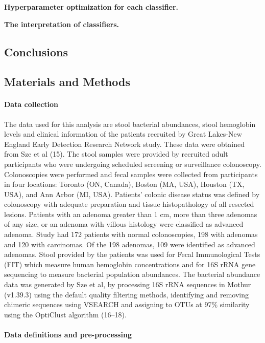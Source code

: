 \documentclass[11pt,]{article}
\let\oldparagraph\paragraph
\renewcommand{\paragraph}[1]{\oldparagraph{#1}\mbox{}}
\begin{document}
\textbf{Hyperparameter optimization for each classifier.}

\textbf{The interpretation of classifiers.}

\subsection{Conclusions}\label{conclusions}

\subsection{Materials and Methods}\label{materials-and-methods}

\paragraph{Data collection}\label{data-collection}

The data used for this analysis are stool bacterial abundances, stool
hemoglobin levels and clinical information of the patients recruited by
Great Lakes-New England Early Detection Research Network study. These
data were obtained from Sze et al (15). The stool samples were provided
by recruited adult participants who were undergoing scheduled screening
or surveillance colonoscopy. Colonoscopies were performed and fecal
samples were collected from participants in four locations: Toronto (ON,
Canada), Boston (MA, USA), Houston (TX, USA), and Ann Arbor (MI, USA).
Patients' colonic disease status was defined by colonoscopy with
adequate preparation and tissue histopathology of all resected lesions.
Patients with an adenoma greater than 1 cm, more than three adenomas of
any size, or an adenoma with villous histology were classified as
advanced adenoma. Study had 172 patients with normal colonoscopies, 198
with adenomas and 120 with carcinomas. Of the 198 adenomas, 109 were
identified as advanced adenomas. Stool provided by the patients was used
for Fecal Immunological Tests (FIT) which measure human hemoglobin
concentrations and for 16S rRNA gene sequencing to measure bacterial
population abundances. The bacterial abundance data was generated by Sze
et al, by processing 16S rRNA sequences in Mothur (v1.39.3) using the
default quality filtering methods, identifying and removing chimeric
sequences using VSEARCH and assigning to OTUs at 97\% similarity using
the OptiClust algorithm (16--18).

\paragraph{Data definitions and
pre-processing}\label{data-definitions-and-pre-processing}
\end{document}
